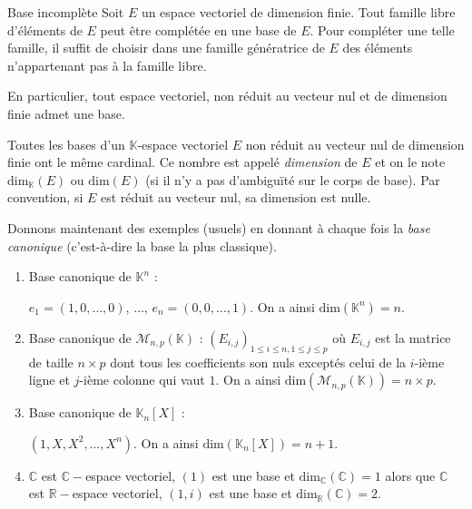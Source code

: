 \documentclass[french,11pt,twoside]{VcCours}
\begin{document}
 
 \begin{Theoreme}{Base incomplète}\label{BaseInc}
 Soit $E$ un espace vectoriel de dimension finie. Tout famille libre d'éléments de $E$ peut être complétée en une base de $E$. Pour compléter une telle famille, il suffit de choisir dans une famille génératrice de $E$ des éléments n'appartenant pas à la famille libre.
 
 \medskip
 
En particulier, tout espace vectoriel, non réduit au vecteur nul et de dimension finie admet une base.
 \end{Theoreme}
% 
% 

 \begin{Theoreme}{} Toutes les bases d'un $\mathbb{K}$-espace vectoriel $E$ non réduit au vecteur nul de dimension finie ont le même cardinal. Ce nombre est appelé \emph{dimension} de $E$ et on le note $\textrm{dim}_{\mathbb{K}}(E)$ ou $\textrm{dim}(E)$ (si il n'y a pas d'ambiguïté sur le corps de base). Par convention, si $E$ est réduit au vecteur nul, sa dimension est nulle.
 \end{Theoreme}
 

 
 Donnons maintenant des exemples (usuels) en donnant à chaque fois la \emph{base canonique} (c'est-à-dire la base la plus classique).
 
 \medskip
 
 \begin{Exemples}
\begin{enumerate}
 \item Base canonique de $\mathbb{K}^n$ : 
 
 $e_1 = (1, 0 , \ldots , 0)$, $\ldots$, $e_n = (0, 0, \ldots, 1)$. On a ainsi $\textrm{dim}(\mathbb{K}^n)=n$.
 \item Base canonique de $\mathcal{M}_{n,p}(\mathbb{K})$ : $(E_{i,j})_{1 \leq i \leq n, 1 \leq j \leq p}$ où $E_{i,j}$ est la matrice de taille $n \times p$ dont tous les coefficients son nuls exceptés celui de la $i$-ième ligne et $j$-ième colonne qui vaut $1$. On a ainsi $\textrm{dim}(\mathcal{M}_{n,p}(\mathbb{K}))=n \times p$.
 \item Base canonique de $\mathbb{K}_n[X]$ : 
 
 $(1,X,X^2, \ldots, X^n)$. On a ainsi $\textrm{dim}(\mathbb{K}_n[X])=n+1$.
 \item $\mathbb{C}$ est $\mathbb{C}-$espace vectoriel, $(1)$ est une base et $\textrm{dim}_{\mathbb{C}}(\mathbb{C})=1$ alors que $\mathbb{C}$ est $\mathbb{R}-$espace vectoriel, $(1,i)$ est une base et $\textrm{dim}_{\mathbb{R}}(\mathbb{C})=2$.
 \end{enumerate}
\end{Exemples}
 
\end{document}

